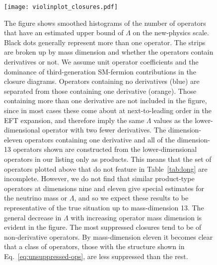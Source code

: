 \begin{figure}
  \centering
  \texttt{[image: violinplot\_closures.pdf]}
  \caption{The figure shows smoothed histograms of the number of operators that
    have an estimated upper bound of $\Lambda$ on the new-physics scale. Black
    dots generally represent more than one operator. The strips are broken up by
    mass dimension and whether the operators contain derivatives or not. We
    assume unit operator coefficients and the dominance of third-generation
    SM-fermion contributions in the closure diagrams. Operators containing no
    derivatives (blue) are separated from those containing one derivative
    (orange). Those containing more than one derivative are not included in the
    figure, since in most cases these come about at next-to-leading order in the
    EFT expansion, and therefore imply the same $\Lambda$ values as the
    lower-dimensional operator with two fewer derivatives. The dimension-eleven
    operators containing one derivative and all of the dimension-13 operators
    shown are constructed from the lower-dimensional operators in our listing
    only as products. This means that the set of operators plotted above that do
    not feature in Table~\ref{tab:long} are incomplete. However, we do not find
    that similar product-type operators at dimensions nine and eleven give
    special estimates for the neutrino mass or $\Lambda$, and so we expect these
    results to be representative of the true situation up to mass-dimension 13.
    The general decrease in $\Lambda$ with increasing operator mass dimension is
    evident in the figure. The most suppressed closures tend to be of
    non-derivative operators. By mass-dimension eleven it becomes clear that a
    class of operators, those with the structure shown in
    Eq.~\eqref{eq:unsuppressed-ops}, are less suppressed than the rest.}
  \label{fig:violinplot-closures}
\end{figure}

